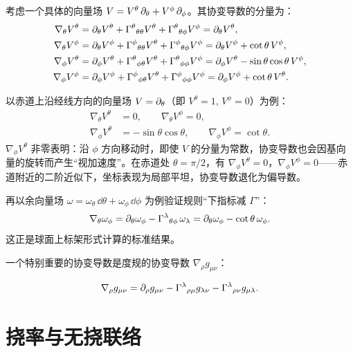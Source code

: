 考虑一个具体的向量场 $V = V^\theta\,\partial_\theta + V^\phi\,\partial_\phi$。其协变导数的分量为：
\begin{align}
    \nabla_\theta V^\theta &= \partial_\theta V^\theta + \Gamma^\theta{}_{\theta\theta}V^\theta + \Gamma^\theta{}_{\theta\phi}V^\phi = \partial_\theta V^\theta, \\
    \nabla_\theta V^\phi &= \partial_\theta V^\phi + \Gamma^\phi{}_{\theta\theta}V^\theta + \Gamma^\phi{}_{\theta\phi}V^\phi = \partial_\theta V^\phi + \cot\theta\,V^\phi, \\
    \nabla_\phi V^\theta &= \partial_\phi V^\theta + \Gamma^\theta{}_{\phi\theta}V^\theta + \Gamma^\theta{}_{\phi\phi}V^\phi = \partial_\phi V^\theta - \sin\theta\cos\theta\,V^\phi, \\
    \nabla_\phi V^\phi &= \partial_\phi V^\phi + \Gamma^\phi{}_{\phi\theta}V^\theta + \Gamma^\phi{}_{\phi\phi}V^\phi = \partial_\phi V^\phi + \cot\theta\,V^\theta.
\end{align}

以赤道上沿经线方向的向量场 $V = \partial_\theta$（即 $V^\theta = 1$, $V^\phi = 0$）为例：
\begin{align}
    \nabla_\theta V^\theta &= 0, \qquad \nabla_\theta V^\phi = 0, \\
    \nabla_\phi V^\theta &= -\sin\theta\cos\theta, \qquad \nabla_\phi V^\phi = \cot\theta.
\end{align}
$\nabla_\phi V^\theta$ 非零表明：沿 $\phi$ 方向移动时，即使 $V$ 的分量为常数，协变导数也会因基向量的旋转而产生“视加速度”。在赤道处 $\theta = \pi/2$，有 $\nabla_\phi V^\theta = 0$，$\nabla_\phi V^\phi = 0$——赤道附近的二阶近似下，坐标表现为局部平坦，协变导数退化为偏导数。

再以余向量场 $\omega = \omega_\theta\,\dd\theta + \omega_\phi\,\dd\phi$ 为例验证规则“下指标减 $\Gamma$”：
\begin{equation}
    \nabla_\theta \omega_\phi = \partial_\theta\omega_\phi - \Gamma^\lambda{}_{\theta\phi}\,\omega_\lambda 
    = \partial_\theta\omega_\phi - \cot\theta\,\omega_\phi.
\end{equation}
这正是球面上标架形式计算的标准结果。

一个特别重要的协变导数是度规的协变导数 $\nabla_\rho g_{\mu\nu}$：

\begin{equation}
    \nabla_\rho g_{\mu\nu} = \partial_\rho g_{\mu\nu} - \Gamma^\lambda{}_{\rho\mu} g_{\lambda\nu} - \Gamma^\lambda{}_{\rho\nu} g_{\mu\lambda}.
\end{equation}

\section{挠率与无挠联络}

